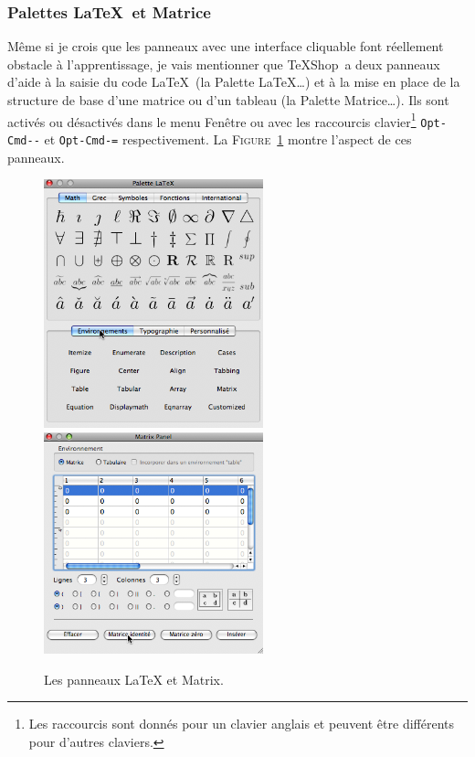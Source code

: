 \documentclass[11pt,french]{article}
\newcommand{\TS}{\textsf{\TeX Shop}}
\newcommand{\mnu}[1]{\textsf{#1}}
\begin{document}
\subsubsection{Palettes \LaTeX\ et Matrice}

Même si je crois que les panneaux avec une interface cliquable font réellement obstacle à l'apprentissage, je vais mentionner que \TS\ a deux panneaux d'aide à la saisie du code \LaTeX\ (la \mnu{Palette LaTeX…}) et à la mise en place de la structure de base d'une matrice ou d'un tableau (la \mnu{Palette Matrice…}). Ils sont activés ou désactivés dans le menu \mnu{Fenêtre} ou avec les raccourcis clavier\footnote{Les raccourcis sont donnés pour un clavier anglais et peuvent être différents pour d'autres claviers.} \texttt{Opt-Cmd-{}-} et \texttt{Opt-Cmd-=} respectivement. La \textsc{Figure}~\ref{fig:LandMPanels} montre l'aspect de ces panneaux.
\begin{figure}
\includegraphics[width=2.5in]{figs/palette}\hfill\includegraphics[width=2.5in]
{figs/matrice}
\caption{Les panneaux LaTeX et Matrix.}
\label{fig:LandMPanels}
\end{figure}
\end{document}
